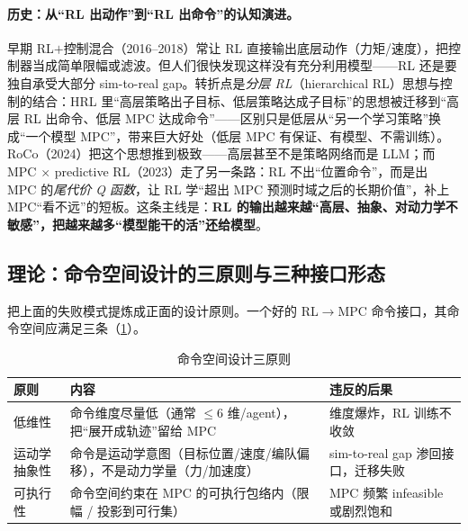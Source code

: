 \paragraph{历史：从“RL 出动作”到“RL 出命令”的认知演进。}
早期 RL$+$控制混合（2016--2018）常让 RL 直接输出底层动作（力矩/速度），把控制器当成简单限幅或滤波。但人们很快发现这样没有充分利用模型——RL 还是要独自承受大部分 sim-to-real gap。转折点是\emph{分层 RL}（hierarchical RL）思想与控制的结合：HRL 里“高层策略出子目标、低层策略达成子目标”的思想被迁移到“高层 RL 出命令、低层 MPC 达成命令”——区别只是低层从“另一个学习策略”换成“一个模型 MPC”，带来巨大好处（低层 MPC 有保证、有模型、不需训练）。RoCo\cite{mandi2024roco}（2024）把这个思想推到极致——高层甚至不是策略网络而是 LLM；而 MPC $\times$ predictive RL\cite{bjelonic2023mpcrl}（2023）走了另一条路：RL 不出“位置命令”，而是出 MPC 的\emph{尾代价 Q 函数}，让 RL 学“超出 MPC 预测时域之后的长期价值”，补上 MPC“看不远”的短板。这条主线是：\textbf{RL 的输出越来越“高层、抽象、对动力学不敏感”，把越来越多“模型能干的活”还给模型}。

\subsection{理论：命令空间设计的三原则与三种接口形态}
\label{sec:mh-cmd-space}

把上面的失败模式提炼成正面的设计原则。一个好的 RL$\to$MPC 命令接口，其命令空间应满足三条（\cref{tab:mh-cmd-principle}）。

\begin{table}[H]\centering\small
\caption{命令空间设计三原则}
\label{tab:mh-cmd-principle}
\begin{tabular}{p{2.4cm}p{5.6cm}p{4.2cm}}
\toprule
原则 & 内容 & 违反的后果 \\
\midrule
低维性 & 命令维度尽量低（通常 $\le 6$ 维/agent），把“展开成轨迹”留给 MPC & 维度爆炸，RL 训练不收敛 \\
运动学抽象性 & 命令是运动学意图（目标位置/速度/编队偏移），不是动力学量（力/加速度） & sim-to-real gap 渗回接口，迁移失败 \\
可执行性 & 命令空间约束在 MPC 的可执行包络内（限幅 / 投影到可行集） & MPC 频繁 infeasible 或剧烈饱和 \\
\bottomrule
\end{tabular}
\end{table}

